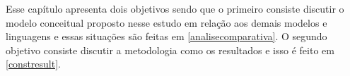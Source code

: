 Esse capítulo apresenta dois objetivos sendo que o primeiro consiste discutir o modelo conceitual proposto nesse estudo em relação aos demais modelos e linguagens e essas situações são feitas em  \ref{analisecomparativa}. O segundo objetivo consiste discutir a metodologia como os resultados e isso é feito em \ref{constresult}.